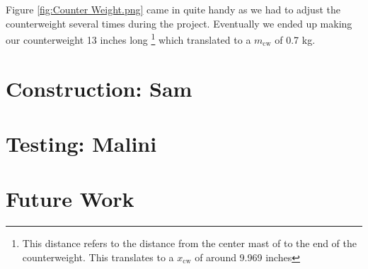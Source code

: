 \documentclass[letterpaper, 12pt]{article}
\begin{document}
Figure \ref{fig:Counter Weight.png} came in quite handy as we had to adjust the counterweight several times during the project.
Eventually we ended up making our counterweight 13 inches long \footnote{This distance refers to the distance from the center mast of to the end of the counterweight. This translates to a $x_{\text{cw}}$ of around 9.969 inches} which translated to a $m_{\text{cw}}$ of 0.7 kg.

\section{Construction: Sam }
\section{Testing: Malini}

\section{Future Work}
\end{document}
